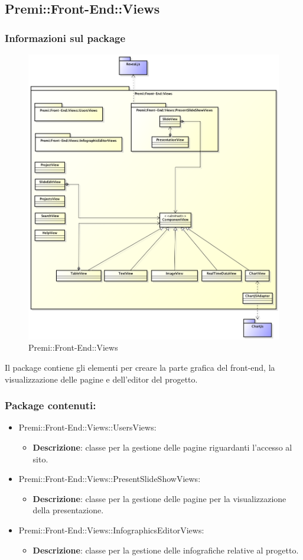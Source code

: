 		
\subsection{Premi::Front-End::Views}
	\subsubsection*{Informazioni sul package}
		\begin{figure}[h]
			\centering
			\includegraphics[width=0.7\linewidth]{img/front-end_views}
			\caption[Premi::Front-End::Views]{Premi::Front-End::Views}
		\end{figure}
		Il package contiene gli elementi per creare la parte grafica del front-end, la visualizzazione delle pagine e dell'editor del progetto.
	
	\subsubsection*{Package contenuti:}

	\begin{itemize}		
		\item Premi::Front-End::Views::UsersViews:
			\begin{itemize}
				\item \textbf{Descrizione}: classe per la gestione delle pagine riguardanti l'accesso al sito.
			\end{itemize}
		
		\item Premi::Front-End::Views::PresentSlideShowViews:
			\begin{itemize}
				\item \textbf{Descrizione}: classe per la gestione delle pagine per la visualizzazione della presentazione.
			\end{itemize}
		
		\item Premi::Front-End::Views::InfographicsEditorViews:
		\begin{itemize}
			\item \textbf{Descrizione}: classe per la gestione delle infografiche relative al progetto.
		\end{itemize}
	\end{itemize}
	
